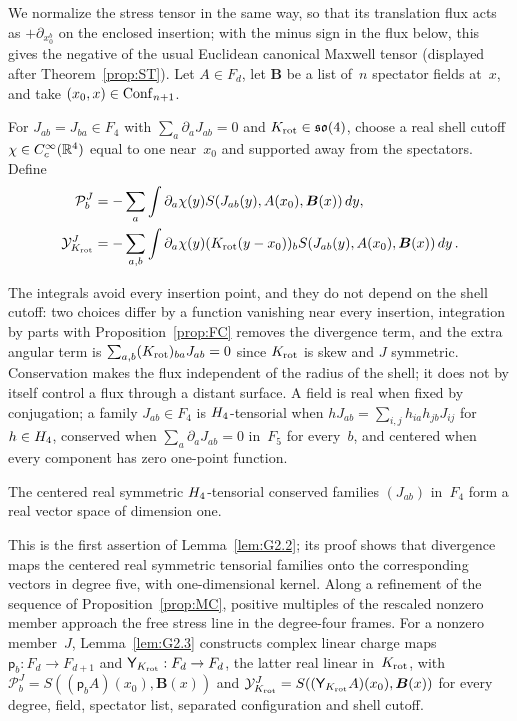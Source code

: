 We normalize the stress tensor in the same way, so that its translation flux acts as $+\partial_{x_0^b}$ on the enclosed insertion; with the minus sign in the flux below, this gives the negative of the usual Euclidean canonical Maxwell tensor (displayed after Theorem~\ref{prop:ST}). Let $A\in F_d$, let $\boldsymbol B$ be a list of~$n$ spectator fields at~$x$, and take $(x_0,x)\in\mathrm{Conf}_{n+1}$.

\begin{definition}\label{def:D13}
For $J_{ab}=J_{ba}\in F_4$ with $\sum_a\partial_aJ_{ab}=0$ and $K_{\rm rot}\in\mathfrak{so}(4)$, choose a real shell cutoff $\chi\in C_c^\infty(\mathbb{R}^4)$ equal to one near~$x_0$ and supported away from the spectators. Define
\begin{align*}
\mathcal P_b^J&=-\sum_a\int\partial_a\chi(y)
S(J_{ab}(y),A(x_0),\boldsymbol B(x))\,dy,\\
\mathcal Y_{K_{\rm rot}}^J&=-\sum_{a,b}\int\partial_a\chi(y)(K_{\rm rot}(y-x_0))_b
S(J_{ab}(y),A(x_0),\boldsymbol B(x))\,dy\,.
\end{align*}
\end{definition}

The integrals avoid every insertion point, and they do not depend on the shell cutoff: two choices differ by a function vanishing near every insertion, integration by parts with Proposition~\ref{prop:FC} removes the divergence term, and the extra angular term is $\sum_{a,b}(K_{\rm rot})_{ba}J_{ab}=0$ since $K_{\rm rot}$ is skew and $J$ symmetric. Conservation makes the flux independent of the radius of the shell; it does not by itself control a flux through a distant surface. A field is real when fixed by conjugation; a family $J_{ab}\in F_4$ is $H_4$-tensorial when $hJ_{ab}=\sum_{i,j}h_{ia}h_{jb}J_{ij}$ for $h\in H_4$, conserved when $\sum_a\partial_aJ_{ab}=0$ in~$F_5$ for every~$b$, and centered when every component has zero one-point function.

\begin{proposition}\label{prop:conserved-line}
The centered real symmetric $H_4$-tensorial conserved families $(J_{ab})$ in~$F_4$ form a real vector space of dimension one.
\end{proposition}

This is the first assertion of Lemma~\ref{lem:G2.2}; its proof shows that divergence maps the centered real symmetric tensorial families onto the corresponding vectors in degree five, with one-dimensional kernel. Along a refinement of the sequence of Proposition~\ref{prop:MC}, positive multiples of the rescaled nonzero member approach the free stress line in the degree-four frames. For a nonzero member~$J$, Lemma~\ref{lem:G2.3} constructs complex linear charge maps $\mathsf p_b:F_d\to F_{d+1}$ and $\mathsf Y_{K_{\rm rot}}:F_d\to F_d$, the latter real linear in~$K_{\rm rot}$, with $\mathcal P_b^J=S((\mathsf p_bA)(x_0),\boldsymbol B(x))$ and $\mathcal Y_{K_{\rm rot}}^J=S((\mathsf Y_{K_{\rm rot}}A)(x_0),\boldsymbol B(x))$ for every degree, field, spectator list, separated configuration and shell cutoff.

